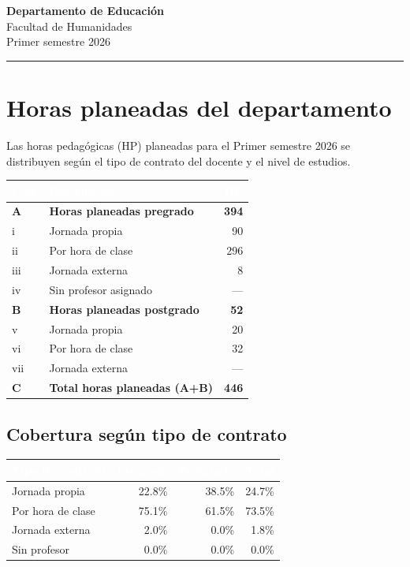\documentclass[11pt, a4paper]{article}
\begin{document}
\begin{center}
  {\Large\bfseries\color{usachDark} Departamento de Educación} \\[0.4em]
  {\large\color{usachTeal} Facultad de Humanidades} \\[0.2em]
  {\normalsize\color{gray} Primer semestre 2026}
\end{center}
\vspace{0.5em}
\textcolor{usachTeal}{\rule{\linewidth}{2pt}}
\vspace{1em}

\section{Horas planeadas del departamento}

Las horas pedagógicas (HP) planeadas para el Primer semestre 2026 se distribuyen según el tipo de contrato del docente y el nivel de estudios.

\begin{tabularx}{\linewidth}{l X r}
\toprule
\rowcolor{usachDark} \textbf{\textcolor{white}{Cód.}} & \textbf{\textcolor{white}{Descripción}} & \textbf{\textcolor{white}{HP}} \\
\midrule
\rowcolor{rowHighlight}\textbf{A} & \textbf{Horas planeadas pregrado} & \textbf{394} \\
\rowcolor{rowEven}i & Jornada propia & 90 \\
ii & Por hora de clase & 296 \\
\rowcolor{rowEven}iii & Jornada externa & 8 \\
iv & Sin profesor asignado & --- \\
\rowcolor{rowHighlight}\textbf{B} & \textbf{Horas planeadas postgrado} & \textbf{52} \\
v & Jornada propia & 20 \\
\rowcolor{rowEven}vi & Por hora de clase & 32 \\
vii & Jornada externa & --- \\
\rowcolor{rowHighlight}\textbf{C} & \textbf{Total horas planeadas (A+B)} & \textbf{446} \\
\bottomrule
\end{tabularx}

\subsection{Cobertura según tipo de contrato}

\begin{tabular}{lrrr}
\toprule
\rowcolor{usachDark} \textbf{\textcolor{white}{Tipo de contrato}} & \textbf{\textcolor{white}{Pregrado}} & \textbf{\textcolor{white}{Postgrado}} & \textbf{\textcolor{white}{Total}} \\
\midrule
Jornada propia & 22.8\% & 38.5\% & 24.7\% \\
\rowcolor{rowEven}Por hora de clase & 75.1\% & 61.5\% & 73.5\% \\
Jornada externa & 2.0\% & 0.0\% & 1.8\% \\
\rowcolor{rowEven}Sin profesor & 0.0\% & 0.0\% & 0.0\% \\
\bottomrule
\end{tabular}
\end{document}
